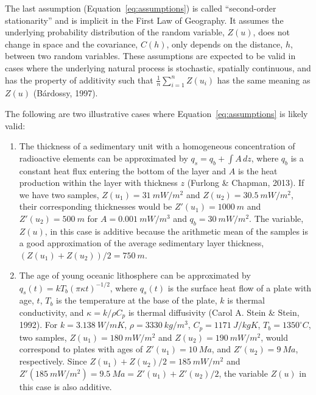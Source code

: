 \documentclass[draft,linenumbers]{agujournal2018}
\begin{document}
The last assumption (Equation~\ref{eq:assumptions}) is called
``second-order stationarity'' and is implicit in the First Law of
Geography. It assumes the underlying probability distribution of the
random variable, \(Z(u)\), does not change in space and the covariance,
\(C(h)\), only depends on the distance, \(h\), between two random
variables. These assumptions are expected to be valid in cases where the
underlying natural process is stochastic, spatially continuous, and has
the property of additivity such that \(\frac{1}{n}\sum_{i=1}^n Z(u_i)\)
has the same meaning as \(Z(u)\) (Bárdossy, 1997).

The following are two illustrative cases where
Equation~\ref{eq:assumptions} is likely valid:

\begin{enumerate}
\def\labelenumi{\arabic{enumi}.}
\item
  The thickness of a sedimentary unit with a homogeneous concentration
  of radioactive elements can be approximated by
  \(q_s = q_b + \int A \,dz\), where \(q_b\) is a constant heat flux
  entering the bottom of the layer and \(A\) is the heat production
  within the layer with thickness \(z\) (Furlong \& Chapman, 2013). If
  we have two samples, \(Z(u_1) = 31~mW/m^2\) and
  \(Z(u_2) = 30.5~mW/m^2\), their corresponding thicknesses would be
  \(Z'(u_1) = 1000~m\) and \(Z'(u_2) = 500~m\) for \(A = 0.001~mW/m^3\)
  and \(q_b = 30~mW/m^2\). The variable, \(Z(u)\), in this case is
  additive because the arithmetic mean of the samples is a good
  approximation of the average sedimentary layer thickness,
  \((Z(u_1) + Z(u_2)) / 2 = 750~m\).
\item
  The age of young oceanic lithosphere can be approximated by
  \(q_s(t) = kT_b(\pi\kappa t)^{-1/2}\), where \(q_s(t)\) is the surface
  heat flow of a plate with age, \(t\), \(T_b\) is the temperature at
  the base of the plate, \(k\) is thermal conductivity, and
  \(\kappa = k/\rho C_p\) is thermal diffusivity (Carol A. Stein \&
  Stein, 1992). For \(k = 3.138~W/mK\), \(\rho = 3330~kg/m^3\),
  \(C_p = 1171~J/kgK\), \(T_b = 1350^{\circ}C\), two samples,
  \(Z(u_1) = 180~mW/m^2\) and \(Z(u_2) = 190~mW/m^2\), would correspond
  to plates with ages of \(Z'(u_1) = 10~Ma\), and \(Z'(u_2) = 9~Ma\),
  respectively. Since \(Z(u_1) + Z(u_2) / 2 = 185~mW/m^2\) and
  \(Z'(185~mW/m^2) = 9.5~Ma = Z'(u_1) + Z'(u_2) / 2\), the variable
  \(Z(u)\) in this case is also additive.
\end{enumerate}
\end{document}
